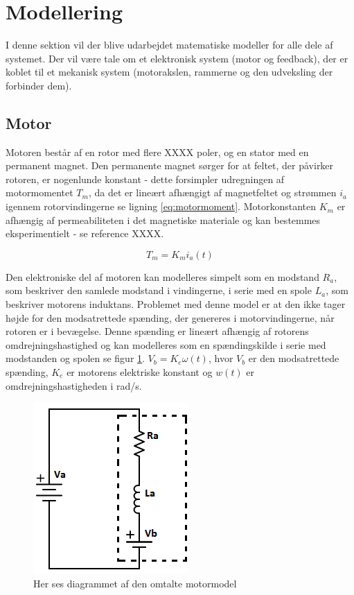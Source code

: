 \section{Modellering}
I denne sektion vil der blive udarbejdet matematiske modeller for alle dele af systemet. Der vil være tale om et elektronisk system (motor og feedback), der er koblet til et mekanisk system (motorakslen, rammerne og den udveksling der forbinder dem). 

\subsection{Motor}
Motoren består af en rotor med flere XXXX poler, og en stator med en permanent magnet. Den permanente magnet sørger for at feltet, der påvirker rotoren, er nogenlunde konstant - dette forsimpler udregningen af motormomentet $T_{m}$, da det er lineært afhængigt af magnetfeltet og strømmen $i_{a}$ igennem rotorvindingerne se ligning \ref{eq:motormoment}. Motorkonstanten $K_{m}$ er afhængig af permeabiliteten i det magnetiske materiale og kan bestemmes eksperimentielt - se reference \cite{azevedo2013} XXXX.

\begin{equation}\label{eq:motormoment}
T_{m}=K_{m}i_{a}(t)
\end{equation}

Den elektroniske del af motoren kan modelleres simpelt som en modstand $R_{a}$, som beskriver den samlede modstand i vindingerne, i serie med en spole $L_{a}$, som beskriver motorens induktans. Problemet med denne model er at den ikke tager højde for den modsatrettede spænding, der genereres i motorvindingerne, når rotoren er i bevægelse. Denne spænding er lineært afhængig af rotorens omdrejningshastighed og kan modelleres som en spændingskilde i serie med modstanden og spolen se figur \ref{fig:motor_sch}. $V_{b}=K_{e}\omega(t)$, hvor $V_{b}$ er den modsatrettede spænding, $K_{e}$ er motorens elektriske konstant og $w(t)$ er omdrejningshastigheden i rad/s.\\



\begin{figure}
	\begin{center}
		\includegraphics[scale=0.8]{Billeder/Motormodel.png}
	\end{center}
	\caption{Her ses diagrammet af den omtalte motormodel}
	\label{fig:motor_sch}
\end{figure}


